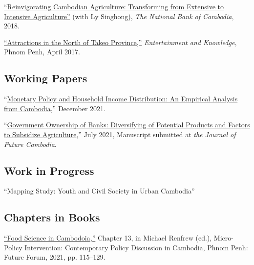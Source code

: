 \documentclass[10pt,a4paper]{article}
\begin{document}
	\href{https://ideas.repec.org/p/pra/mprapa/93086.html}{``Reinvigorating Cambodian Agriculture: Transforming from Extensive to Intensive Agriculture”} (with Ly Singhong), \textit{The National Bank of Cambodia}, 2018. \\ \vspace{-.5em}
			
	\href{https://www.facebook.com/7khmer/photos/?tab=album&album_id=878953958911035}{``Attractions in the North of Takeo Province,”} \textit{Entertainment and Knowledge}, Phnom Penh, April 2017. 

\subsection*{Working Papers}

	“\href{https://kosalnith.github.io/research/papers/MPHI.pdf}{Monetary Policy and Household Income Distribution: An Empirical Analysis from Cambodia},” December 2021.\\ \vspace{-.5em}
	
	“\href{https://kosalnith.github.io/research/papers/GOB.pdf}{Government Ownership of Banks: Diversifying of Potential Products and Factors to Subsidize Agriculture},” July 2021, Manuscript submitted at \textit{the Journal of Future Cambodia}.

\subsection*{Work in Progress}
	
	``Mapping Study: Youth and Civil Society in Urban Cambodia''

\subsection*{Chapters in Books}
	
	\href{https://kosalnith.github.io/research/policies/PolicyBrief-FST.pdf}{``Food Science in Cambodoia,''} Chapter 13, in Michael Renfrew (ed.), Micro-Policy Intervention: Contemporary Policy Discussion in Cambodia, Phnom Penh: Future Forum, 2021, pp. 115–129. 
	
\end{document}

